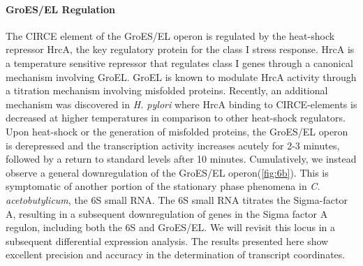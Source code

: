 \paragraph{GroES/EL Regulation}
The CIRCE element of the GroES/EL operon is regulated by the heat-shock repressor HrcA, the key regulatory protein for the class I stress response. HrcA is a temperature sensitive repressor that regulates class I genes through a canonical mechanism involving GroEL. GroEL is known to modulate HrcA activity through a titration mechanism involving misfolded proteins\cite{42,76,77}. Recently, an additional mechanism was discovered in \textit{H. pylori} where HrcA binding to CIRCE-elements is decreased at higher temperatures in comparison to other heat-shock regulators\cite{77}. Upon heat-shock or the generation of misfolded proteins, the GroES/EL operon is derepressed and the transcription activity increases acutely for 2-3 minutes, followed by a return to standard levels after 10 minutes\cite{76}. Cumulatively, we instead observe a general downregulation of the GroES/EL operon(\ref{fig:6b}). This is symptomatic of another portion of the stationary phase phenomena in \textit{C. acetobutylicum}, the 6S small RNA. The 6S small RNA titrates the Sigma-factor A, resulting in a subsequent downregulation of genes in the Sigma factor A regulon, including both the 6S and GroES/EL. We will revisit this locus in a subsequent differential expression analysis. The results presented here show excellent precision and accuracy in the determination of transcript coordinates.



